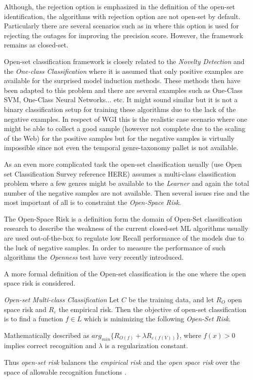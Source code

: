 Although, the rejection option is emphasized in the definition of the open-set identification, the algorithms with rejection option are not open-set by default. Particularly there are several scenarios such as in \parencite{onan2018ensemble} where this option is used for rejecting the outages for improving the precision score. However, the framework remains as closed-set.

Open-set classification framework is closely related to the \textit{Novelty Detection} and the \textit{One-class Classification} where it is assumed that only positive examples are available for the surprised model induction methods. These methods then have been adapted to this problem and there are several examples such as One-Class SVM, One-Class Neural Networks... etc. It might sound similar but it is not a binary classification setup for training these algorithms due to the lack of the negative examples. In respect of WGI this is the realistic case scenario where one might be able to collect a good sample (however not complete due to the scaling of the Web) for the positive samples but for the negative samples is virtually impossible since not even the temporal genre-taxonomy pallet is not available. 

As an even more complicated task the open-set classification usually (use Open set Classification Survey reference HERE) assumes a multi-class classification problem where a few genres might be available to the \textit{Learner} and again the total number of the negative samples are not available. Then several issues rise and the most important of all is to constraint the \textit{Open-Space Risk}.

The {Open-Space Risk} is a definition form the domain of Open-Set classification research to describe the weakness of the current closed-set ML algorithms usually are used out-of-the-box to regulate low Recall performance of the models due to the luck of negative samples. In order to measure the performance of such algorithms the \textit{Openness} test have very recently introduced. 

A more formal definition of the Open-set classification is the one where the open space risk is considered.

\begin{definition}{\textit{Open-set Multi-class Classification}}
Let $C$ be the training data, and let $R_{O}$ open space risk and $R_{ε}$ the empirical risk. Then the objective of open-set classification is to find a function $f \in L$ which is minimizing the following \textit{Open-Set Risk}. 

Mathematically described as $arg_{min} \{R_{O(f )} + \lambda R_{ε (f (V ))}\}$, where $f (x) > 0$ implies correct recognition and $\lambda$ is a regularization constant.

Thus \textit{open-set risk} balances the \textit{empirical risk} and the \textit{open space risk} over the space of allowable recognition functions \parencite{geng2018recent}.
\end{definition}

